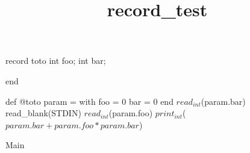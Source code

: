 \documentclass[8pt]{article}
\title{record\_test}
\begin{document}
\maketitle
record toto int foo;
int bar;

end


\begin{algorithm}[H]
def @toto param = with foo = $ 0 $
bar = $ 0 $ end
$read_{int}$(param.bar)\;
read\_blank(STDIN)\;
$read_{int}$(param.foo)\;
$print_{int}$($ param.bar + param.foo * param.bar $)\;
\caption{Main}
\end{algorithm}
\end{document}
